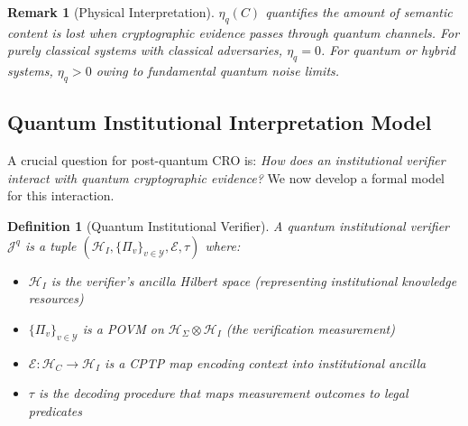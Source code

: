 \documentclass{ieeeaccess}
\newtheorem{definition}{Definition}[section]
\newtheorem{remark}{Remark}[section]
\begin{document}
\begin{remark}[Physical Interpretation]
$\eta_q(C)$ quantifies the amount of semantic content is lost when cryptographic evidence passes through quantum channels. For purely classical systems with classical adversaries, $\eta_q = 0$. For quantum or hybrid systems, $\eta_q > 0$ owing to fundamental quantum noise limits.
\end{remark}

\subsection{Quantum Institutional Interpretation Model}

A crucial question for post-quantum CRO is: \textit{How does an institutional verifier interact with quantum cryptographic evidence?} We now develop a formal model for this interaction.

\begin{definition}[Quantum Institutional Verifier]
A quantum institutional verifier $\mathcal{J}^q$ is a tuple $(\mathcal{H}_I, \{\Pi_v\}_{v \in \mathcal{Y}}, \mathcal{E}, \tau)$ where:
\begin{itemize}
    \item $\mathcal{H}_I$ is the verifier's ancilla Hilbert space (representing institutional knowledge resources)
    \item $\{\Pi_v\}_{v \in \mathcal{Y}}$ is a POVM on $\mathcal{H}_\Sigma \otimes \mathcal{H}_I$ (the verification measurement)
    \item $\mathcal{E}: \mathcal{H}_C \to \mathcal{H}_I$ is a CPTP map encoding context into institutional ancilla
    \item $\tau$ is the decoding procedure that maps measurement outcomes to legal predicates
\end{itemize}
\end{definition}
\end{document}
